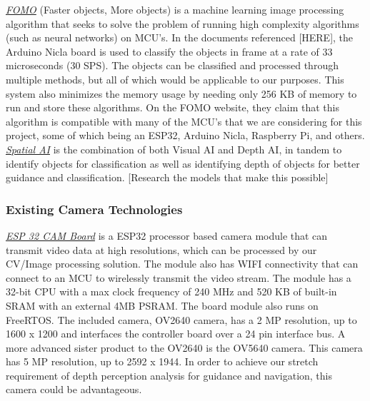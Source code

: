 \noindent \underline{\textit{FOMO}} (Faster objects, More objects) is a machine learning image processing algorithm that seeks to solve the problem of running high complexity algorithms (such as neural networks) on MCU's. In the documents referenced [HERE], the Arduino Nicla board is used to classify the objects in frame at a rate of 33 microseconds (30 SPS). The objects can be classified and processed through multiple methods, but all of which would be applicable to our purposes. This system also minimizes the memory usage by needing only 256 KB of memory to run and store these algorithms. On the FOMO website, they claim that this algorithm is compatible with many of the MCU's that we are considering for this project, some of which being an ESP32, Arduino Nicla, Raspberry Pi, and others. \\

\noindent \underline{\textit{Spatial AI}} is the combination of both Visual AI and Depth AI, in tandem to identify objects for classification as well as identifying depth of objects for better guidance and classification. [Research the models that make this possible]\\

\subsubsection{Existing Camera Technologies}
\noindent \underline{\textit{ESP 32 CAM Board}} is a ESP32 processor based camera module that can transmit video data at high resolutions, which can be processed by our CV/Image processing solution. The module also has WIFI connectivity that can connect to an MCU to wirelessly transmit the video stream. The module has a 32-bit CPU with a max clock frequency of 240 MHz and 520 KB of built-in SRAM with an external 4MB PSRAM. The board module also runs on FreeRTOS. The included camera, OV2640 camera, has a 2 MP resolution, up to 1600 x 1200 and interfaces the controller board over a 24 pin interface bus. A more advanced sister product to the OV2640 is the OV5640 camera. This camera has 5 MP resolution, up to 2592 x 1944. In order to achieve our stretch requirement of depth perception analysis for guidance and navigation, this camera could be advantageous.\\

